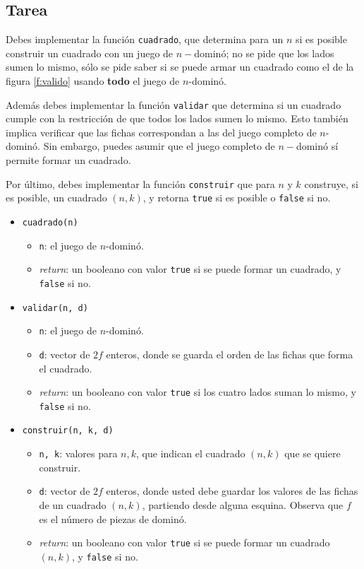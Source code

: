 \documentclass{oci}
\begin{document}
\subsection*{Tarea}

Debes implementar la función \verb+cuadrado+, que determina para un $n$ si es posible construir un cuadrado con un juego de $n-$dominó; no se pide que los lados sumen lo mismo, sólo se pide saber si se puede armar un cuadrado como el de la figura \ref{f:valido} usando \textbf{todo} el juego de $n$-dominó.

Además debes implementar la función \verb+validar+ que determina si un cuadrado cumple con la restricción de que todos los lados sumen lo mismo.
Esto también implica verificar que las fichas correspondan a las del juego completo de $n$-dominó.
Sin embargo, puedes asumir que el juego completo de $n-$dominó sí permite formar un cuadrado.

Por último, debes implementar la función \verb+construir+ que para $n$ y $k$ construye, si es posible, un cuadrado $(n,k)$, y retorna \verb+true+ si es posible o \verb+false+ si no.

\begin{itemize}
 \item \verb+cuadrado(n)+
 \begin{itemize}
  \item \verb+n+: el juego de $n$-dominó.
  \item \emph{return}: un booleano con valor \verb+true+ si se puede formar un cuadrado, y \verb+false+ si no.
 \end{itemize}
 \item \verb+validar(n, d)+
 \begin{itemize}
  \item \verb+n+: el juego de $n$-dominó.
  \item \verb+d+: vector de $2f$ enteros, donde se guarda el orden de las fichas que forma el cuadrado.
  \item \emph{return}: un booleano con valor \verb+true+ si los cuatro lados suman lo mismo, y \verb+false+ si no.
 \end{itemize}

 \item \verb+construir(n, k, d)+
 \begin{itemize}
  \item \verb+n, k+: valores para $n,k$, que indican el cuadrado $(n,k)$ que se quiere construir.
  \item \verb+d+: vector de $2f$ enteros, donde usted debe guardar los valores de las fichas de un cuadrado $(n,k)$, partiendo desde alguna esquina. Observa que $f$ es el número de piezas de dominó.
  \item \emph{return}: un booleano con valor \verb+true+ si se puede formar un cuadrado $(n,k)$, y \verb+false+ si no.
 \end{itemize}
\end{itemize}
\end{document}
